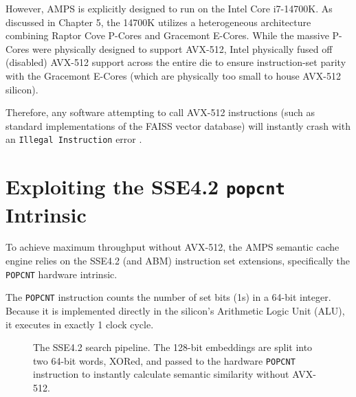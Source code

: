 However, AMPS is explicitly designed to run on the Intel Core i7-14700K. As discussed in Chapter 5, the 14700K utilizes a heterogeneous architecture combining Raptor Cove P-Cores and Gracemont E-Cores. While the massive P-Cores were physically designed to support AVX-512, Intel physically fused off (disabled) AVX-512 support across the entire die to ensure instruction-set parity with the Gracemont E-Cores (which are physically too small to house AVX-512 silicon).

Therefore, any software attempting to call AVX-512 instructions (such as standard implementations of the FAISS vector database) will instantly crash with an \texttt{Illegal Instruction} error \cite{intel2024optimization}.

\section{Exploiting the SSE4.2 \texttt{popcnt} Intrinsic}

To achieve maximum throughput without AVX-512, the AMPS semantic cache engine relies on the SSE4.2 (and ABM) instruction set extensions, specifically the \texttt{POPCNT} hardware intrinsic.

The \texttt{POPCNT} instruction counts the number of set bits (1s) in a 64-bit integer. Because it is implemented directly in the silicon's Arithmetic Logic Unit (ALU), it executes in exactly 1 clock cycle.

\begin{figure}[htbp]
\centering
{}
\caption{The SSE4.2 search pipeline. The 128-bit embeddings are split into two 64-bit words, XORed, and passed to the hardware \texttt{POPCNT} instruction to instantly calculate semantic similarity without AVX-512.}
\label{fig:sse42_pipeline}
\end{figure}

